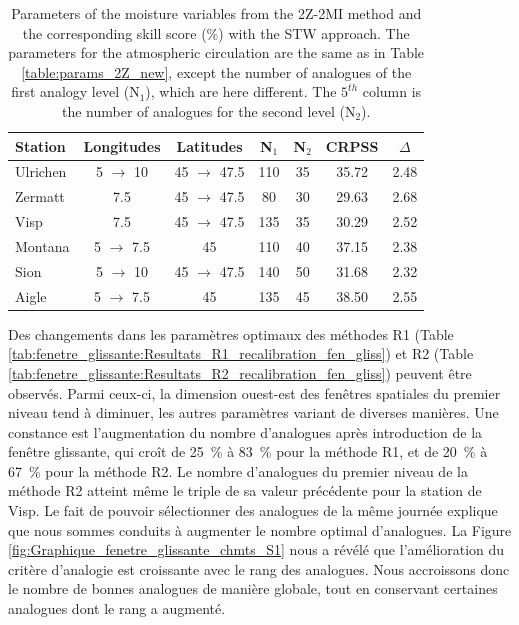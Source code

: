 \documentclass[hess]{copernicus}
\begin{document}
\begin{table}[htb]
	\caption{Parameters of the moisture variables from the 2Z-2MI method and the corresponding skill score (\%) with the STW approach. The parameters for the atmospheric circulation are the same as in Table \ref{table:params_2Z_new}, except the number of analogues of the first analogy level (N$_{1}$), which are here different. The $5^{th}$ column is the number of analogues for the second level (N$_{2}$).}
	\begin{center}
		\begin{tabular}{l c c c c c c }
			\hline
			\textbf{Station} & \textbf{Longitudes} & \textbf{Latitudes} & \textbf{N$_{1}$} & \textbf{N$_{2}$} & \textbf{CRPSS} & \textbf{$\Delta$} \\
			\hline
			Ulrichen & 5 $\rightarrow$ 10 & 45 $\rightarrow$ 47.5 & 110 & 35 & 35.72 & 2.48 \\
			Zermatt & 7.5 & 45 $\rightarrow$ 47.5 & 80 & 30 & 29.63 & 2.68 \\
			Visp & 7.5 & 45 $\rightarrow$ 47.5 & 135 & 35 & 30.29 & 2.52 \\
			Montana & 5 $\rightarrow$ 7.5 & 45 & 110 & 40 & 37.15 & 2.38 \\
			Sion & 5 $\rightarrow$ 10 & 45 $\rightarrow$ 47.5 & 140 & 50 & 31.68 & 2.32 \\
			Aigle & 5 $\rightarrow$ 7.5 & 45 & 135 & 45 & 38.50 & 2.55 \\ 
			\hline
		\end{tabular}
	\end{center}
	\label{table:params_2Z-2MI_new}
\end{table}




Des changements dans les paramètres optimaux des méthodes R1 (Table \ref{tab:fenetre_glissante:Resultats_R1_recalibration_fen_gliss}) et R2 (Table \ref{tab:fenetre_glissante:Resultats_R2_recalibration_fen_gliss}) peuvent être observés. Parmi ceux-ci, la dimension ouest-est des fenêtres spatiales du premier niveau tend à diminuer, les autres paramètres variant de diverses manières. Une constance est l'augmentation du nombre d'analogues après introduction de la fenêtre glissante, qui croît de 25~\% à 83~\% pour la méthode R1, et de 20~\% à 67~\% pour la méthode R2. Le nombre d'analogues du premier niveau de la méthode R2 atteint même le triple de sa valeur précédente pour la station de Visp. Le fait de pouvoir sélectionner des analogues de la même journée explique que nous sommes conduits à augmenter le nombre optimal d'analogues. La Figure \ref{fig:Graphique_fenetre_glissante_chmts_S1} nous a révélé que l'amélioration du critère d'analogie est croissante avec le rang des analogues. Nous accroissons donc le nombre de bonnes analogues de manière globale, tout en conservant certaines analogues dont le rang a augmenté.
\end{document}
